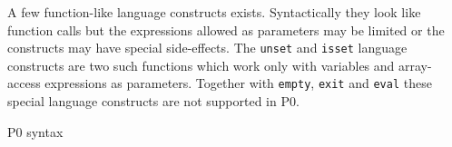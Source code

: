 A few function-like language constructs exists. Syntactically they look like function calls but the expressions allowed as parameters may be limited or the constructs may have special side-effects. The \texttt{unset} and \texttt{isset} language constructs are two such functions which work only with variables and array-access expressions as parameters. Together with \texttt{empty}, \texttt{exit} and \texttt{eval} these special language constructs are not supported in P0.

\begin{grammarf}
\centering

\caption{P0 syntax }
\label{gramm:p0}
\end{grammarf}